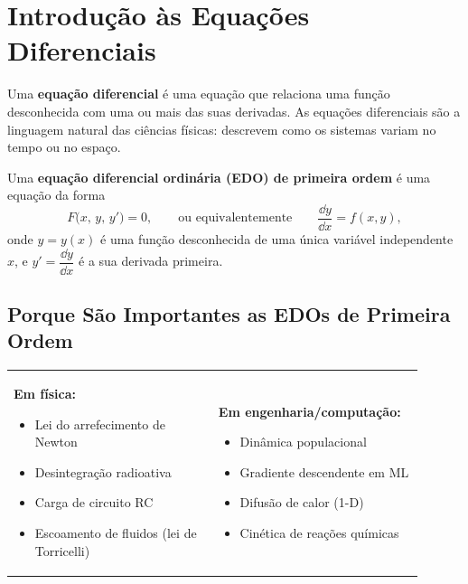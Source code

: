 \section{Introdução às Equações Diferenciais}
\label{sec:intro5}

Uma \textbf{equação diferencial} é uma equação que relaciona uma função desconhecida com
uma ou mais das suas derivadas. As equações diferenciais são a linguagem natural das
ciências físicas: descrevem como os sistemas variam no tempo ou no espaço.

\begin{defbox}[title={Equação Diferencial Ordinária (EDO) de Primeira Ordem}]
  Uma \textbf{equação diferencial ordinária (EDO) de primeira ordem} é uma equação da forma
  \[
    F\!\bigl(x,\, y,\, y'\bigr) = 0,
    \qquad\text{ou equivalentemente}\qquad
    \frac{\dd y}{\dd x} = f(x, y),
  \]
  onde $y = y(x)$ é uma função desconhecida de uma única variável independente $x$, e
  $y' = \dfrac{\dd y}{\dd x}$ é a sua derivada primeira.
\end{defbox}

\subsection{Porque São Importantes as EDOs de Primeira Ordem}

\begin{tabular}{p{0.45\linewidth} p{0.45\linewidth}}
  \textbf{Em física:}
  \begin{itemize}[noitemsep]
    \item Lei do arrefecimento de Newton
    \item Desintegração radioativa
    \item Carga de circuito RC
    \item Escoamento de fluidos (lei de Torricelli)
  \end{itemize}
  &
  \textbf{Em engenharia/computação:}
  \begin{itemize}[noitemsep]
    \item Dinâmica populacional
    \item Gradiente descendente em ML
    \item Difusão de calor (1-D)
    \item Cinética de reações químicas
  \end{itemize}
\end{tabular}


